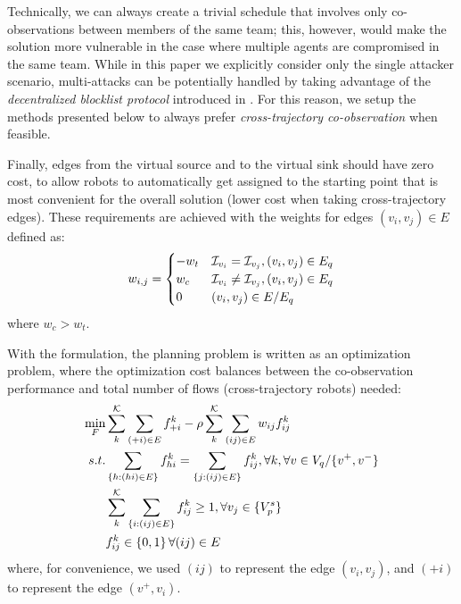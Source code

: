 \documentclass[10pt,twocolumn,twoside]{IEEEtran}
\begin{document}
Technically, we can always create a trivial schedule that involves only co-observations between members of the same team; this, however, would make the solution more vulnerable in the case where multiple agents are compromised in the same team. While in this paper we explicitly consider only the single attacker scenario, multi-attacks can be potentially handled by taking advantage of the \emph{decentralized blocklist protocol} introduced in \cite{wardega2023byzantine}. For this reason, we setup the methods presented below to always prefer \emph{cross-trajectory co-observation} when feasible.

Finally, edges from the virtual source and to the virtual sink should have zero cost, to allow robots to automatically get assigned to the starting point that is most convenient for the overall solution (lower cost when taking cross-trajectory edges).
These requirements are achieved with the weights for edges $(v_{i},v_{j})\in E$ defined as:
\begin{equation}
	w_{i,j}=\begin{cases}
	-w_{t} & \mathcal{I}_{v_{i}}=\mathcal{I}_{v_{j}}, (v_{i},v_{j})\in E_{q}\\
	w_{c} & \mathcal{I}_{v_{i}} \neq \mathcal{I}_{v_{j}}, (v_{i},v_{j})\in E_{q}\\
	0 &  (v_{i},v_{j})\in E / E_{q} 
	\end{cases}
\end{equation}
where $w_{c} > w_{t}$. 

With the formulation, the planning problem is written as an optimization problem, where the optimization cost balances between the co-observation performance and total number of flows (cross-trajectory robots) needed:
 \begin{subequations} \label{eq:flow-coverage-problem}
     \begin{align}
        \min_{F} &\sum^{\mathcal{K}}_{k} \sum_{(+i)\in E} f^{k}_{+i} - \rho \sum^{\mathcal{K}}_k \sum_{(ij)\in E} w_{ij} f^k_{ij} \label{eq:flow-cost}\\
        s.t. & \sum_{\{h:(hi) \in E\}}f^k_{hi}=\sum_{\{j:(ij) \in E\}}f^k_{ij},  \forall k,\forall v \in V_{q} / \{v^{+}, v^{-}\}  \label{eq:FlowBalanceConstraint}\\
        & \sum^{\mathcal{K}}_k\sum_{\{i:(ij)\in E \}} f^k_{ij} \geq 1, \forall v_{j} \in \{V^{s}_{p}\} \label{eq:FlowCoverage}\\
        & f^k_{ij} \in \{0,1\} \,  \forall (ij)\in E\label{eq:SingleFLowCapacity}
     \end{align}
 \end{subequations}
where, for convenience, we used $(ij)$ to represent the edge $(v_{i},v_{j})$, and $(+i)$ to represent the edge $(v^{+},v_{i})$.
\end{document}
